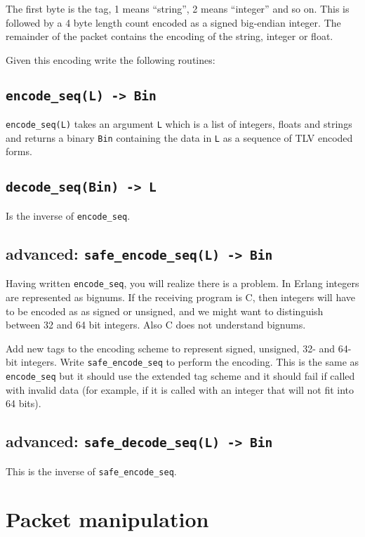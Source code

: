 \documentclass[12pt]{hitec}
\begin{document}
The first byte is the tag, 1 means ``string'', 2 means ``integer'' and
so on.  This is followed by a 4 byte length count encoded as a signed
big-endian integer. The remainder of the packet contains the encoding
of the string, integer or float.

Given this encoding write the following routines:

\subsection{\texttt{encode\_seq(L) -> Bin}}

\verb+encode_seq(L)+ takes an argument \verb+L+ which is a list of integers,
floats and strings and returns a binary \verb+Bin+ containing the
data in \verb+L+ as a sequence of  TLV encoded forms.

\subsection{\texttt{decode\_seq(Bin) -> L}}

Is the inverse of \verb+encode_seq+.


\subsection{advanced: \texttt{safe\_encode\_seq(L) -> Bin}}

Having written \verb+encode_seq+, you will realize there is a
problem. In Erlang integers are represented as bignums. If the
receiving program is C, then integers will have to be encoded as as
signed or unsigned, and we might want to distinguish between 32 and 64
bit integers. Also C does not understand bignums.

Add new tags to the encoding scheme to represent signed, unsigned, 32- and 64- bit
integers. Write \verb+safe_encode_seq+ to perform the encoding. This is the same
as \verb+encode_seq+ but it should use the extended tag scheme and it should
fail if called with invalid data (for example, if it is called with an integer
that will not fit into 64 bits).

 \subsection{advanced: \texttt{safe\_decode\_seq(L) -> Bin}}

This is the inverse of \verb+safe_encode_seq+.

\section{Packet manipulation}
\end{document}
